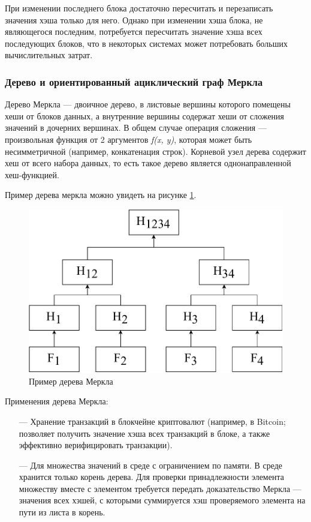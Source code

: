 При изменении последнего блока достаточно пересчитать и перезаписать значения хэша только для него. Однако при изменении хэша блока, не являющегося последним, потребуется пересчитать значение хэша всех последующих блоков, что в некоторых системах может потребовать больших вычислительных затрат.

\subsubsection{Дерево и ориентированный ациклический граф Меркла}

Дерево Меркла\cite{merkle} --- двоичное дерево, в листовые вершины которого помещены хеши от блоков данных, а внутренние вершины содержат хеши от сложения значений в дочерних вершинах. В общем случае операция сложения --- произвольная функция от 2 аргументов \textit{f(x, y)}, которая может быть несимметричной (например, конкатенация строк). Корневой узел дерева содержит хеш от всего набора данных, то есть такое дерево является однонаправленной хеш-функцией.

Пример дерева меркла можно увидеть на рисунке \ref{fig:mtree}.

\begin{figure}[hbtp]
    \centering
    \includegraphics[width=\textwidth]{img/merkletree.pdf}
    \caption{Пример дерева Меркла}
    \label{fig:mtree}
\end{figure}

Применения дерева Меркла:
\begin{itemize}
    \item[---] Хранение транзакций в блокчейне криптовалют (например, в Bitcoin; позволяет получить значение хэша всех транзакций в блоке, а также эффективно верифицировать транзакции).
    \item[---] Для множества значений в среде с ограничением по памяти. В среде хранится только корень дерева. Для проверки принадлежности элемента множеству вместе с элементом требуется передать доказательство Меркла --- значения всех хэшей, с которыми суммируется хэш проверяемого элемента на пути из листа в корень.
\end{itemize}

